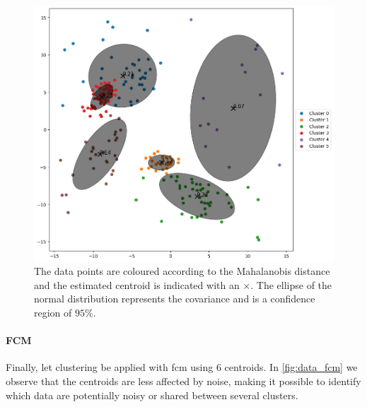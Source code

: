 \begin{figure}[H]
	\centering
	\includegraphics[width=0.9\linewidth]{Figures/dati_gmm.png}
	\caption[Example of GMM clustering]{The data points are coloured according to the Mahalanobis distance and the estimated centroid is indicated with an $\times$. The ellipse of the normal distribution represents the covariance and is a confidence region of $95\%$.}
	\label{fig:data_gmm}
\end{figure}

\newpage
\paragraph{FCM} Finally, let clustering be applied with \gls{fcm} using $6$ centroids. In \cref{fig:data_fcm} we observe that the centroids are less affected by noise, making it possible to identify which data are potentially noisy or shared between several clusters.

